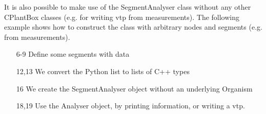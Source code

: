 It is also possible to make use of the SegmentAnalyser class without any other CPlantBox classes (e.g. for writing vtp from measurements). The following example shows how to construct the class with arbitrary nodes and segments (e.g. from measurements). 



\begin{itemize}
 \item[6-9] Define some segments with data
 \item[12,13] We convert the Python list to lists of C++ types
 \item[16] We create the SegmentAnalyser object without an underlying Organism
 \item[18,19] Use the Analyser object, by printing information, or writing a vtp. 
\end{itemize}
